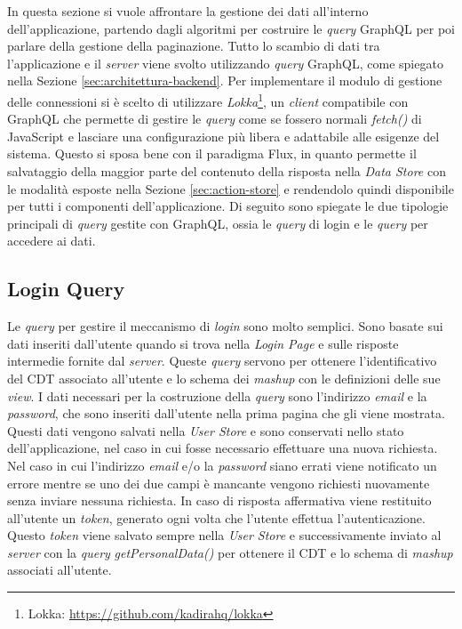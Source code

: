 In questa sezione si vuole affrontare la gestione dei dati all'interno dell'ap\-pli\-ca\-zio\-ne, partendo dagli algoritmi per costruire le \emph{query} GraphQL per poi parlare della gestione della paginazione.
Tutto lo scambio di dati tra l'applicazione e il \emph{server} viene svolto utilizzando \emph{query} GraphQL, come spiegato nella Sezione \ref{sec:architettura-backend}. Per implementare il modulo di gestione delle connessioni si è scelto di utilizzare \emph{Lokka}\footnote{Lokka: \url{https://github.com/kadirahq/lokka}}, un \emph{client} compatibile con GraphQL che permette di gestire le \emph{query} come se fossero normali \emph{fetch()} di JavaScript e lasciare una configurazione più libera e adattabile alle esigenze del sistema. Questo si sposa bene con il paradigma Flux, in quanto permette il salvataggio della maggior parte del contenuto della risposta nella \emph{Data Store} con le modalità esposte nella Sezione \ref{sec:action-store} e rendendolo quindi disponibile per tutti i componenti dell'applicazione. Di seguito sono spiegate le due tipologie principali di \emph{query} gestite con GraphQL, ossia le \emph{query} di login e le \emph{query} per accedere ai dati.

\subsection{Login Query}

Le \emph{query} per gestire il meccanismo di \emph{login} sono molto semplici. Sono basate sui dati inseriti dall'utente quando si trova nella \emph{Login Page} e sulle risposte intermedie fornite dal \emph{server}. Queste \emph{query} servono per ottenere l'identificativo del CDT associato all'utente e lo schema dei \emph{mashup} con le definizioni delle sue \emph{view}.
I dati necessari per la costruzione della \emph{query} sono l'indirizzo \emph{email} e la \emph{password}, che sono inseriti dall'utente nella prima pagina che gli viene mostrata. Questi dati vengono salvati nella \emph{User Store} e sono conservati nello stato dell'applicazione, nel caso in cui fosse necessario effettuare una nuova richiesta. Nel caso in cui l'indirizzo \emph{email} e/o la \emph{password} siano errati viene notificato un errore mentre se uno dei due campi è mancante vengono richiesti nuovamente senza inviare nessuna richiesta.
In caso di risposta affermativa viene restituito all'utente un \emph{token}, generato ogni volta che l'utente effettua l'autenticazione. Questo \emph{token} viene salvato sempre nella \emph{User Store} e successivamente inviato al \emph{server} con la \emph{query} \emph{getPersonalData()} per ottenere il CDT e lo schema di \emph{mashup} associati all'utente.

